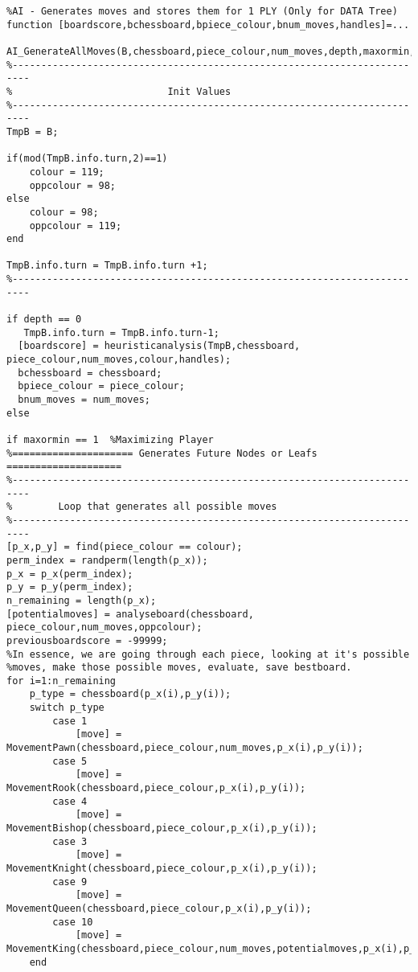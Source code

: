 \documentclass{article}
\begin{document}
\begin{lstlisting}
%AI - Generates moves and stores them for 1 PLY (Only for DATA Tree)
function [boardscore,bchessboard,bpiece_colour,bnum_moves,handles]=...
    AI_GenerateAllMoves(B,chessboard,piece_colour,num_moves,depth,maxormin,alpha,beta,handles)
%-------------------------------------------------------------------------
%                           Init Values
%-------------------------------------------------------------------------
TmpB = B;

if(mod(TmpB.info.turn,2)==1)
    colour = 119;
    oppcolour = 98;
else
    colour = 98;
    oppcolour = 119;
end

TmpB.info.turn = TmpB.info.turn +1;
%-------------------------------------------------------------------------

if depth == 0
   TmpB.info.turn = TmpB.info.turn-1;
  [boardscore] = heuristicanalysis(TmpB,chessboard, piece_colour,num_moves,colour,handles);
  bchessboard = chessboard;
  bpiece_colour = piece_colour;
  bnum_moves = num_moves;
else

if maxormin == 1  %Maximizing Player
%===================== Generates Future Nodes or Leafs ====================
%-------------------------------------------------------------------------
%        Loop that generates all possible moves
%-------------------------------------------------------------------------
[p_x,p_y] = find(piece_colour == colour);
perm_index = randperm(length(p_x));
p_x = p_x(perm_index);
p_y = p_y(perm_index);
n_remaining = length(p_x);
[potentialmoves] = analyseboard(chessboard, piece_colour,num_moves,oppcolour);
previousboardscore = -99999;
%In essence, we are going through each piece, looking at it's possible
%moves, make those possible moves, evaluate, save bestboard.
for i=1:n_remaining
    p_type = chessboard(p_x(i),p_y(i));
    switch p_type
        case 1
            [move] = MovementPawn(chessboard,piece_colour,num_moves,p_x(i),p_y(i));
        case 5
            [move] = MovementRook(chessboard,piece_colour,p_x(i),p_y(i)); 
        case 4
            [move] = MovementBishop(chessboard,piece_colour,p_x(i),p_y(i));
        case 3
            [move] = MovementKnight(chessboard,piece_colour,p_x(i),p_y(i));
        case 9
            [move] = MovementQueen(chessboard,piece_colour,p_x(i),p_y(i));
        case 10
            [move] = MovementKing(chessboard,piece_colour,num_moves,potentialmoves,p_x(i),p_y(i));
    end


\end{lstlisting}
\end{document}
